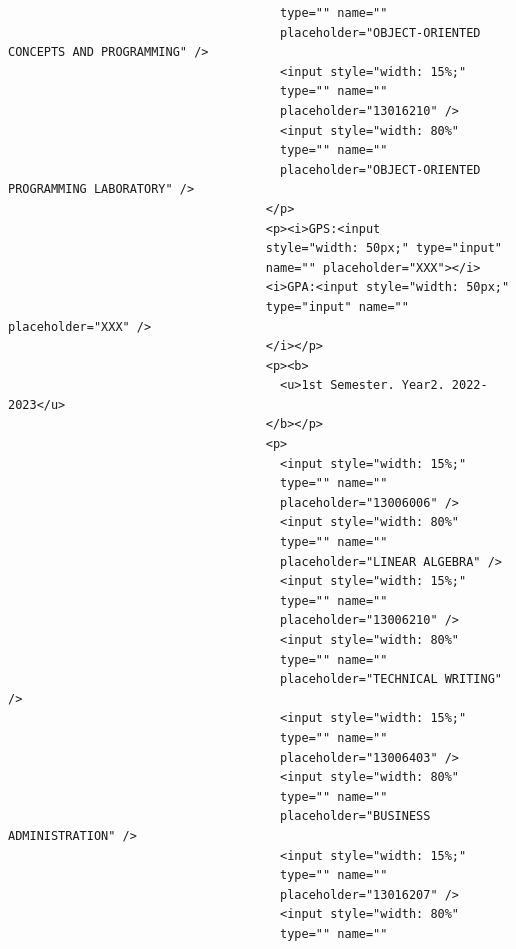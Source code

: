 \documentclass[12pt]{report} %
\begin{document}
\begin{verbatim}
                                      type="" name=""
                                      placeholder="OBJECT-ORIENTED CONCEPTS AND PROGRAMMING" />
                                      <input style="width: 15%;"
                                      type="" name=""
                                      placeholder="13016210" />
                                      <input style="width: 80%"
                                      type="" name=""
                                      placeholder="OBJECT-ORIENTED PROGRAMMING LABORATORY" />
                                    </p>
                                    <p><i>GPS:<input 
                                    style="width: 50px;" type="input"
                                    name="" placeholder="XXX"></i> 
                                    <i>GPA:<input style="width: 50px;"
                                    type="input" name="" placeholder="XXX" />
                                    </i></p>
                                    <p><b>
                                      <u>1st Semester. Year2. 2022-2023</u>
                                    </b></p>
                                    <p>
                                      <input style="width: 15%;"
                                      type="" name=""
                                      placeholder="13006006" />
                                      <input style="width: 80%"
                                      type="" name=""
                                      placeholder="LINEAR ALGEBRA" />
                                      <input style="width: 15%;"
                                      type="" name=""
                                      placeholder="13006210" />
                                      <input style="width: 80%"
                                      type="" name=""
                                      placeholder="TECHNICAL WRITING" />
                                      <input style="width: 15%;"
                                      type="" name=""
                                      placeholder="13006403" />
                                      <input style="width: 80%"
                                      type="" name=""
                                      placeholder="BUSINESS ADMINISTRATION" />
                                      <input style="width: 15%;"
                                      type="" name=""
                                      placeholder="13016207" />
                                      <input style="width: 80%"
                                      type="" name=""

\end{verbatim}
\end{document}
